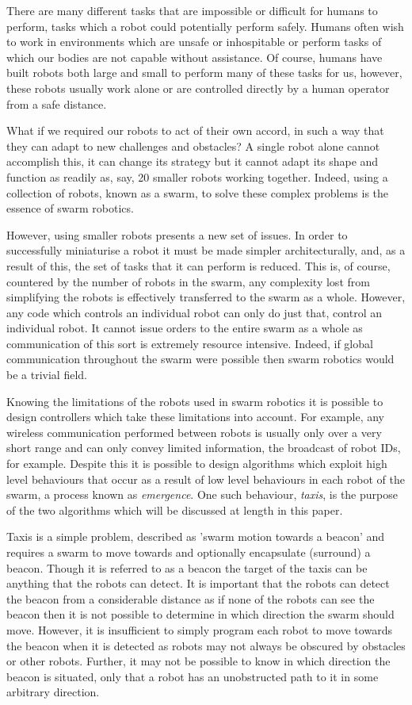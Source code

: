 \documentclass[conference]{IEEEtran}
\begin{document}
There are many different tasks that are impossible or difficult for humans to perform, tasks which a robot could potentially perform safely. Humans often wish to work in environments which are unsafe or inhospitable or perform tasks of which our bodies are not capable without assistance. Of course, humans have built robots both large and small to perform many of these tasks for us, however, these robots usually work alone or are controlled directly by a human operator from a safe distance.

What if we required our robots to act of their own accord, in such a way that they can adapt to new challenges and obstacles? A single robot alone cannot accomplish this, it can change its strategy but it cannot adapt its shape and function as readily as, say, 20 smaller robots working together.  Indeed, using a collection of robots, known as a swarm, to solve these complex problems is the essence of swarm robotics.

However, using smaller robots presents a new set of issues. In order to successfully miniaturise a robot it must be made simpler architecturally, and, as a result of this, the set of tasks that it can perform is reduced. This is, of course, countered by the number of robots in the swarm, any complexity lost from simplifying the robots is effectively transferred to the swarm as a whole. However, any code which controls an individual robot can only do just that, control an individual robot. It cannot issue orders to the entire swarm as a whole as communication of this sort is extremely resource intensive. Indeed, if global communication throughout the swarm were possible then swarm robotics would be a trivial field.

Knowing the limitations of the robots used in swarm robotics it is possible to design controllers which take these limitations into account. For example, any wireless communication performed between robots is usually only over a very short range and can only convey limited information, the broadcast of robot IDs, for example. Despite this it is possible to design algorithms which exploit high level behaviours that occur as a result of low level behaviours in each robot of the swarm, a process known as \textit{emergence}. One such behaviour, \textit{taxis}, is the purpose of the two algorithms which will be discussed at length in this paper.

Taxis is a simple problem, described as 'swarm motion towards a beacon'\cite{bjerknes_analysis_2007} and requires a swarm to move towards and optionally encapsulate (surround) a beacon. Though it is referred to as a beacon the target of the taxis can be anything that the robots can detect. It is important that the robots can detect the beacon from a considerable distance as if none of the robots can see the beacon then it is not possible to determine in which direction the swarm should move. However, it is insufficient to simply program each robot to move towards the beacon when it is detected as robots may not always be obscured by obstacles or other robots. Further, it may not be possible to know in which direction the beacon is situated, only that a robot has an unobstructed path to it in some arbitrary direction. 
\end{document}
